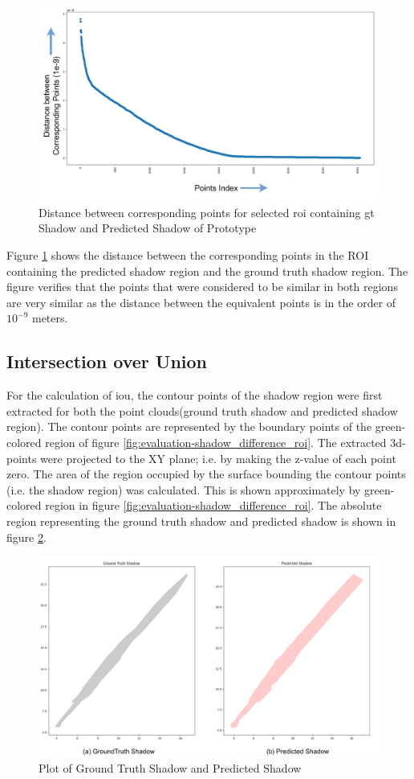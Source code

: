 \begin{figure}[htbp]
    \centering
    \includegraphics[width=0.7\linewidth]{97_graphics//evaluation/distn_betn_corresponding_points_in_shadowcasting.pdf}
    \caption{Distance between corresponding points for selected \acrshort{roi} containing \acrshort{gt} Shadow and Predicted Shadow of Prototype}
    \label{fig:evaluation-distn_betn_corresponding_points_in_shadowcasting}
\end{figure}

Figure \ref{fig:evaluation-distn_betn_corresponding_points_in_shadowcasting} shows the distance between the corresponding points in the ROI containing the predicted shadow region and the ground truth shadow region. The figure verifies that the points that were considered to be similar in both regions are very similar as the distance between the equivalent points is in the order of \(10^{-9}\) meters.

\subsection{Intersection over Union}
For the calculation of \acrfull{iou}, the contour points of the shadow region were first extracted for both the point clouds(ground truth shadow and predicted shadow region). The contour points are represented by the boundary points of the green-colored region of figure \ref{fig:evaluation-shadow_difference_roi}. The extracted 3d-points were projected to the XY plane; i.e. by making the z-value of each point zero. The area of the region occupied by the surface bounding the contour points (i.e. the shadow region) was calculated. This is shown approximately by green-colored region in figure \ref{fig:evaluation-shadow_difference_roi}. The absolute region representing the ground truth shadow and predicted shadow is shown in figure \ref{fig:evaluation-shadow_gt_pred}.
\begin{figure}[htbp]
    \centering
    \includegraphics[width=0.7\linewidth]{97_graphics//evaluation/shadow_gt_pred.pdf}
    \caption{Plot of Ground Truth Shadow and Predicted Shadow}
    \label{fig:evaluation-shadow_gt_pred}
\end{figure}

